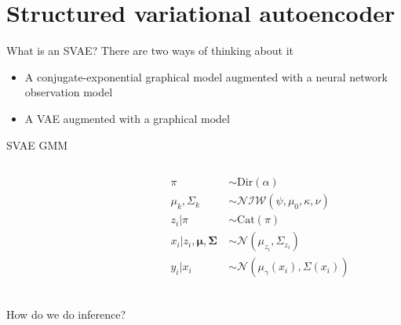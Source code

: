 \documentclass[10pt, compress]{beamer}
\begin{document}
\section{Structured variational autoencoder}

\begin{frame}{What is an SVAE?}
  There are two ways of thinking about it
  \begin{itemize}
    \item A conjugate-exponential graphical model
      augmented with a neural network observation model
    \item A VAE augmented with 
      a graphical model
  \end{itemize}

  \pause

  \centering
  
\end{frame}

\begin{frame}{SVAE GMM}
  \begin{columns}
    \begin{column}{0.5\textwidth}
      
    \end{column}
    \begin{column}{0.5\textwidth}
      \begin{align*}
        \pi &\sim \textrm{Dir}(\alpha) \\
        \mu_k, \Sigma_k &\sim \mathcal{NIW}(\psi, \mu_0, \kappa, \nu) \\
        z_i | \pi &\sim \textrm{Cat}(\pi) \\
        x_i | z_i, \bm{\mu}, \bm{\Sigma} \ &\sim \mathcal{N}(\mu_{z_i}, \Sigma_{z_i}) \\
        y_i | x_i &\sim \mathcal{N}(\mu_\gamma(x_i), \Sigma(x_i)) \\
      \end{align*}
    \end{column}
  \end{columns}
  \pause
  How do we do inference?
\end{frame}
\end{document}
